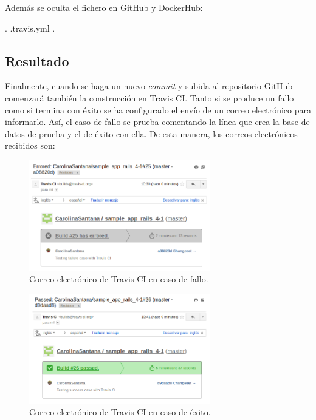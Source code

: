 Además se oculta el fichero  en GitHub y DockerHub:

\begin{codelisting}
\label{code:scriptdocker}
\begin{code}
.
.travis.yml
.
\end{code}
\end{codelisting}

\subsection{Resultado}

Finalmente, cuando se haga un nuevo \textit{commit} y subida al repositorio GitHub comenzará también la construcción en Travis CI. Tanto si se produce un fallo como si termina con éxito se ha configurado el envío de un correo electrónico para informarlo. Así, el caso de fallo se prueba comentando la línea que crea la base de datos de prueba  y el de éxito con ella. De esta manera, los correos electrónicos recibidos son:

\begin{figure}[H]
\centering
\includegraphics[width=0.7\textwidth]{images/figures/travisfailure.png}
\caption{Correo electrónico de Travis CI en caso de fallo.\label{fig:figure_placement_example}}
\end{figure}

\begin{figure}[H]
\centering
\includegraphics[width=0.7\textwidth]{images/figures/travissuccess.png}
\caption{Correo electrónico de Travis CI en caso de éxito.\label{fig:figure_placement_example}}
\end{figure}

